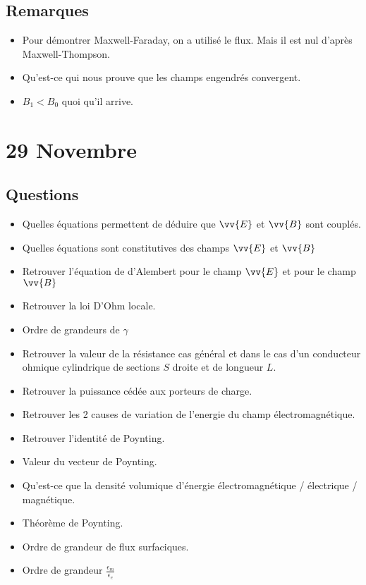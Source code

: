 \documentclass[a4paper, 11pt, hidelinks]{article}
\begin{document}
\subsection{Remarques}


\begin{itemize}
    \item Pour démontrer Maxwell-Faraday, on a utilisé le flux. Mais il est nul d'après Maxwell-Thompson.
    \item Qu'est-ce qui nous prouve que les champs engendrés convergent.
    \item $B_1<B_0$ quoi qu'il arrive.
\end{itemize}




\section{29 Novembre}



\subsection{Questions}

\begin{itemize}
    \item Quelles équations permettent de déduire que $\vv{E}$ et $\vv{B}$ sont couplés. \cite{Chapitre13}
    \item Quelles équations sont constitutives des champs $\vv{E}$ et $\vv{B}$ \cite{Chapitre13}
    \item Retrouver l'équation de d'Alembert pour le champ $\vv{E}$ et pour le champ $\vv{B}$ \cite{Chapitre13}
    \item Retrouver la loi D'Ohm locale. \cite{Chapitre14}
    \item Ordre de grandeurs de $\gamma$ \cite{Chapitre14}
    \item Retrouver la valeur de la résistance cas général et dans le cas d'un conducteur ohmique cylindrique de sections $S$ droite et de longueur $L$. \cite{Chapitre14}
    \item Retrouver la puissance cédée aux porteurs de charge. \cite{Chapitre14}
    \item Retrouver les 2 causes de variation de l'energie du champ électromagnétique. \cite{Chapitre14}
    \item Retrouver l'identité de Poynting. \cite{Chapitre14}
    \item Valeur du vecteur de Poynting. \cite{Chapitre14}
    \item Qu'est-ce que la densité volumique d'énergie électromagnétique / électrique / magnétique. \cite{Chapitre14}
    \item Théorème de Poynting. \cite{Chapitre14}
    \item Ordre de grandeur de flux surfaciques. \cite{Chapitre14}
    \item Ordre de grandeur $\frac{\epsilon_m}{\epsilon_e}$ \cite{Chapitre14}
\end{itemize}
\end{document}
